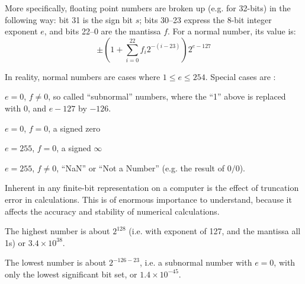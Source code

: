 More specifically, floating point numbers are broken up (e.g. for
32-bits) in the following way: bit 31 is the sign bit $s$; bits 30--23
express the 8-bit integer exponent $e$, and bits 22--0 are the
mantissa $f$. For a normal number, its value is:
\begin{equation}
\pm \left(1 + \sum_{i=0}^{22} f_i 2^{-(i-23)} \right) 2^{e-127}
\end{equation}

In reality, normal numbers are cases where $1\le e \le 254$. Special
cases are :
\begin{ditemize}
\item $e=0$, $f\ne 0$, so called ``subnormal'' numbers, where the
  ``1'' above is replaced with 0, and $e-127$ by $-126$.
\item $e=0$, $f=0$, a signed zero
\item $e=255$, $f=0$, a signed $\infty$
\item $e=255$, $f\ne 0$, ``NaN'' or ``Not a Number'' (e.g. the result
  of $0/0$).
\end{ditemize}

Inherent in any finite-bit representation on a computer is the effect
of truncation error in calculations. This is of enormous importance to
understand, because it affects the accuracy and stability of numerical
calculations. 


\begin{answer}
The highest number is about $2^{128}$ (i.e. with exponent of 127, and
the mantissa all 1s) or $3.4\times 10^{38}$. 

The lowest number is about $2^{-126 -23}$, i.e. a subnormal number
with $e=0$, with only the lowest significant bit set, or $1.4\times
10^{-45}$. 
\end{answer}


